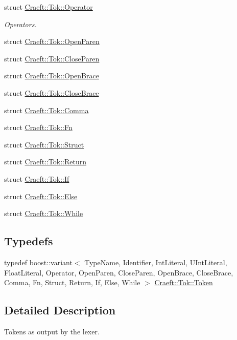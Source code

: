 \begin{DoxyCompactItemize}
struct \hyperlink{struct_craeft_1_1_tok_1_1_operator}{Craeft\+::\+Tok\+::\+Operator}
\begin{DoxyCompactList}\small\item\em Operators. \end{DoxyCompactList}\item 
struct \hyperlink{struct_craeft_1_1_tok_1_1_open_paren}{Craeft\+::\+Tok\+::\+Open\+Paren}
\item 
struct \hyperlink{struct_craeft_1_1_tok_1_1_close_paren}{Craeft\+::\+Tok\+::\+Close\+Paren}
\item 
struct \hyperlink{struct_craeft_1_1_tok_1_1_open_brace}{Craeft\+::\+Tok\+::\+Open\+Brace}
\item 
struct \hyperlink{struct_craeft_1_1_tok_1_1_close_brace}{Craeft\+::\+Tok\+::\+Close\+Brace}
\item 
struct \hyperlink{struct_craeft_1_1_tok_1_1_comma}{Craeft\+::\+Tok\+::\+Comma}
\item 
struct \hyperlink{struct_craeft_1_1_tok_1_1_fn}{Craeft\+::\+Tok\+::\+Fn}
\item 
struct \hyperlink{struct_craeft_1_1_tok_1_1_struct}{Craeft\+::\+Tok\+::\+Struct}
\item 
struct \hyperlink{struct_craeft_1_1_tok_1_1_return}{Craeft\+::\+Tok\+::\+Return}
\item 
struct \hyperlink{struct_craeft_1_1_tok_1_1_if}{Craeft\+::\+Tok\+::\+If}
\item 
struct \hyperlink{struct_craeft_1_1_tok_1_1_else}{Craeft\+::\+Tok\+::\+Else}
\item 
struct \hyperlink{struct_craeft_1_1_tok_1_1_while}{Craeft\+::\+Tok\+::\+While}
\end{DoxyCompactItemize}
\subsection*{Typedefs}
\begin{DoxyCompactItemize}
\item 
typedef boost\+::variant$<$ Type\+Name, Identifier, Int\+Literal, U\+Int\+Literal, Float\+Literal, Operator, Open\+Paren, Close\+Paren, Open\+Brace, Close\+Brace, Comma, Fn, Struct, Return, If, Else, While $>$ \hyperlink{_token_8hh_a521c5743a63e2d5d1871557794e0a8b1}{Craeft\+::\+Tok\+::\+Token}
\end{DoxyCompactItemize}


\subsection{Detailed Description}
Tokens as output by the lexer. 

